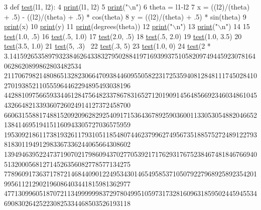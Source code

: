 \begin{DoxyCode}
3 \textcolor{keyword}{def }\hyperlink{namespacetest_math_accae4d78fc0739220d35c06c2c0d5822}{test}(l1, l2):
4     \hyperlink{_a_p_i_8h_ae2dd7886efd463e815dadf10eb54777e}{print}(l1, l2)
5     \hyperlink{_a_p_i_8h_ae2dd7886efd463e815dadf10eb54777e}{print}(\textcolor{stringliteral}{"\(\backslash\)n"})
6     theta = l1-l2
7     x = ((l2)/(theta) + .5) - ((l2)/(theta) + .5) * cos(theta)
8     y = ((l2)/(theta) + .5) * sin(theta)
9     \hyperlink{_a_p_i_8h_ae2dd7886efd463e815dadf10eb54777e}{print}(x)
10     \hyperlink{_a_p_i_8h_ae2dd7886efd463e815dadf10eb54777e}{print}(y)
11     \hyperlink{_a_p_i_8h_ae2dd7886efd463e815dadf10eb54777e}{print}(degrees(theta))
12     \hyperlink{_a_p_i_8h_ae2dd7886efd463e815dadf10eb54777e}{print}(\textcolor{stringliteral}{"\(\backslash\)n"})
13     \hyperlink{_a_p_i_8h_ae2dd7886efd463e815dadf10eb54777e}{print}(\textcolor{stringliteral}{"\(\backslash\)n"})
14 
15 \hyperlink{namespacetest_math_accae4d78fc0739220d35c06c2c0d5822}{test}(1.0, .5)
16 \hyperlink{namespacetest_math_accae4d78fc0739220d35c06c2c0d5822}{test}(.5, 1.0)
17 \hyperlink{namespacetest_math_accae4d78fc0739220d35c06c2c0d5822}{test}(2.0, .5)
18 \hyperlink{namespacetest_math_accae4d78fc0739220d35c06c2c0d5822}{test}(.5, 2.0)
19 \hyperlink{namespacetest_math_accae4d78fc0739220d35c06c2c0d5822}{test}(1.0, 3.5)
20 \hyperlink{namespacetest_math_accae4d78fc0739220d35c06c2c0d5822}{test}(3.5, 1.0)
21 \hyperlink{namespacetest_math_accae4d78fc0739220d35c06c2c0d5822}{test}(5, .3) 
22 \hyperlink{namespacetest_math_accae4d78fc0739220d35c06c2c0d5822}{test}(.3, 5)
23 \hyperlink{namespacetest_math_accae4d78fc0739220d35c06c2c0d5822}{test}(1.0, 0)
24 \hyperlink{namespacetest_math_accae4d78fc0739220d35c06c2c0d5822}{test}(2 * 3.14159265358979323846264338327950288419716939937510582097494459230781640628620899862803482534
      211706798214808651328230664709384460955058223172535940812848111745028410270193852110555964462294895493038196
      442881097566593344612847564823378678316527120190914564856692346034861045432664821339360726024914127372458700
      660631558817488152092096282925409171536436789259036001133053054882046652138414695194151160943305727036575959
      195309218611738193261179310511854807446237996274956735188575272489122793818301194912983367336244065664308602
      139494639522473719070217986094370277053921717629317675238467481846766940513200056812714526356082778577134275
      778960917363717872146844090122495343014654958537105079227968925892354201995611212902196086403441815981362977
      477130996051870721134999999837297804995105973173281609631859502445945534690830264252230825334468503526193118

\end{DoxyCode}
